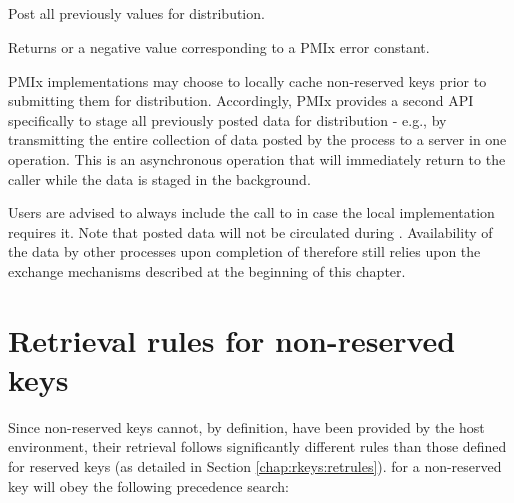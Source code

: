 \subsection{}

\summary

Post all previously  values for distribution.

\format


Returns  or a negative value corresponding to a PMIx error constant.

\descr

\ac{PMIx} implementations may choose to locally cache non-reserved keys prior to submitting them for distribution. Accordingly, \ac{PMIx} provides a second \ac{API} specifically to stage all previously posted data for distribution - e.g., by transmitting the entire collection of data posted by the process to a server in one operation. This is an asynchronous operation that will immediately return to the caller while the data is staged in the background.

\adviceuserstart
Users are advised to always include the call to  in case the local implementation requires it. Note that posted data will not be circulated during . Availability of the data by other processes upon completion of  therefore still relies upon the exchange mechanisms described at the beginning of this chapter.
\adviceuserend


\section{Retrieval rules for non-reserved keys}
\label{chap:nrkeys:retrules}

Since non-reserved keys cannot, by definition, have been provided by the host
environment, their retrieval follows significantly different rules than those
defined for reserved keys (as detailed in Section \ref{chap:rkeys:retrules}).
 for a non-reserved key will obey the
following precedence search:

